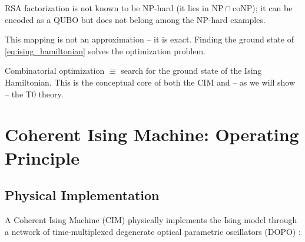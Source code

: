 \begin{table}[h]
    \centering
    \caption{Examples of the mapping of optimization problems (mostly NP-hard) onto Ising Hamiltonians}
    \label{tab:qubo_examples}
\end{table}
RSA factorization is not known to be NP-hard (it lies in $\mathrm{NP} \cap \mathrm{coNP}$); it can be encoded as a QUBO but does not belong among the NP-hard examples.

This mapping is not an approximation -- it is exact. Finding the ground state of
\eqref{eq:ising_hamiltonian} solves the optimization problem.

\begin{important}
    Combinatorial optimization $\equiv$ search for the ground state of the Ising
    Hamiltonian. This is the conceptual core of both the CIM and -- as we will show --
    the T0 theory.
\end{important}

\clearpage

\section{Coherent Ising Machine: Operating Principle}
\label{sec:cim}

\subsection{Physical Implementation}

A Coherent Ising Machine (CIM) physically implements the Ising model through a
network of time-multiplexed degenerate optical parametric oscillators (DOPO)
\cite{yamamoto_cim_2017, honjo_100k_cim_2021}:

